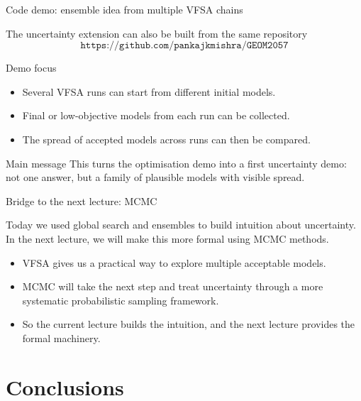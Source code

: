 \documentclass[aspectratio=169]{beamer}
\newcommand{\courserepo}{\texttt{https://github.com/pankajkmishra/GEOM2057}}
\begin{document}
\begin{frame}{Code demo: ensemble idea from multiple VFSA chains}
\small

The uncertainty extension can also be built from the same repository
\[
\courserepo
\]

\begin{block}{Demo focus}
\begin{itemize}
    \item[--] Several VFSA runs can start from different initial models.
    \item[--] Final or low-objective models from each run can be collected.
    \item[--] The spread of accepted models across runs can then be compared.
\end{itemize}
\end{block}

\begin{alertblock}{Main message}
This turns the optimisation demo into a first uncertainty demo: not one answer, but a family of plausible models with visible spread.
\end{alertblock}
\end{frame}

\begin{frame}{Bridge to the next lecture: MCMC}
\small

Today we used global search and ensembles to build intuition about uncertainty. In the next lecture, we will make this more formal using \alert{MCMC} methods.

\vspace{0.1cm}

\begin{itemize}
    \item[--] VFSA gives us a practical way to explore multiple acceptable models.
    \item[--] MCMC will take the next step and treat uncertainty through a more systematic probabilistic sampling framework.
    \item[--] So the current lecture builds the intuition, and the next lecture provides the formal machinery.
\end{itemize}
\end{frame}

\section{Conclusions}
\end{document}
